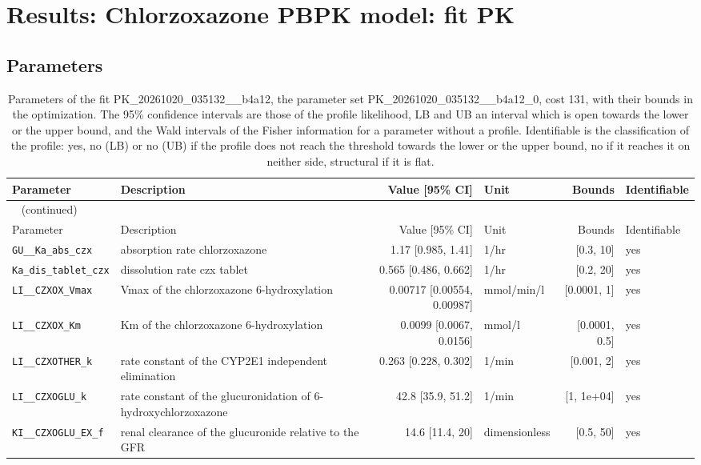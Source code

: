 \section{Results: Chlorzoxazone PBPK model: fit PK}

\subsection{Parameters}

\begin{longtable}{llrlrl}
\caption{Parameters of the fit PK\_20261020\_035132\_\_b4a12, the parameter set PK\_20261020\_035132\_\_b4a12\_0, cost 131, with their bounds in the optimization. The 95\% confidence intervals are those of the profile likelihood, LB and UB an interval which is open towards the lower or the upper bound, and the Wald intervals of the Fisher information for a parameter without a profile. Identifiable is the classification of the profile: yes, no (LB) or no (UB) if the profile does not reach the threshold towards the lower or the upper bound, no if it reaches it on neither side, structural if it is flat.}\label{tab:parameters:PK_20261020_035132__b4a12} \\
\toprule
Parameter & Description & Value [95\% CI] & Unit & Bounds & Identifiable \\
\midrule
\endfirsthead
\multicolumn{6}{l}{\small\tablename~\thetable{} (continued)} \\
\toprule
Parameter & Description & Value [95\% CI] & Unit & Bounds & Identifiable \\
\midrule
\endhead
\bottomrule
\endlastfoot
\texttt{GU\_\_Ka\_abs\_czx} & absorption rate chlorzoxazone & 1.17 [0.985, 1.41] & 1/hr & [0.3, 10] & yes \\
\texttt{Ka\_dis\_tablet\_czx} & dissolution rate czx tablet & 0.565 [0.486, 0.662] & 1/hr & [0.2, 20] & yes \\
\texttt{LI\_\_CZXOX\_Vmax} & Vmax of the chlorzoxazone 6-hydroxylation & 0.00717 [0.00554, 0.00987] & mmol/min/l & [0.0001, 1] & yes \\
\texttt{LI\_\_CZXOX\_Km} & Km of the chlorzoxazone 6-hydroxylation & 0.0099 [0.0067, 0.0156] & mmol/l & [0.0001, 0.5] & yes \\
\texttt{LI\_\_CZXOTHER\_k} & rate constant of the CYP2E1 independent elimination & 0.263 [0.228, 0.302] & 1/min & [0.001, 2] & yes \\
\texttt{LI\_\_CZXOGLU\_k} & rate constant of the glucuronidation of 6-hydroxychlorzoxazone & 42.8 [35.9, 51.2] & 1/min & [1, 1e+04] & yes \\
\texttt{KI\_\_CZXOGLU\_EX\_f} & renal clearance of the glucuronide relative to the GFR & 14.6 [11.4, 20] & dimensionless & [0.5, 50] & yes \\
\end{longtable}

